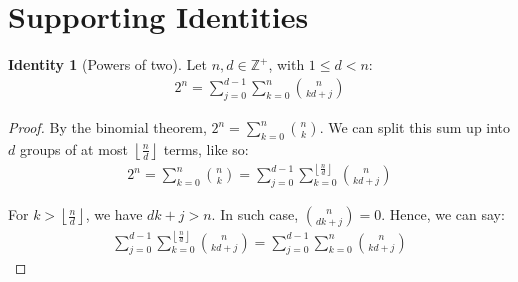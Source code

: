 \documentclass{article}
\theoremstyle{plain}
\theoremstyle{definition}
\newtheorem{identity}{Identity}
\newcommand{\floor}[1]{\left\lfloor #1 \right\rfloor}
\newcommand{\Z}{\mathbb{Z}}
\begin{document}
\section{Supporting Identities}

\begin{identity}[Powers of two] \label{identity:powersoftwobinomialgroups}
Let $n, d \in \Z^+$, with $1 \leq d < n$:
\begin{align}
    2^n = \sum_{j=0}^{d-1} \sum_{k=0}^{n} \binom{n}{kd + j}
\end{align}
\end{identity}
\begin{proof}
    By the binomial theorem, $2^n = \sum_{k=0}^{n} \binom{n}{k}$. We can split this sum up into $d$ groups of at most $\floor{\frac{n}{d}}$ terms, like so:
    \begin{align}
        2^n = \sum_{k=0}^{n} \binom{n}{k} = \sum_{j=0}^{d-1} \sum_{k=0}^{\floor{\frac{n}{d}}} \binom{n}{kd + j}
    \end{align}

    For $k > \floor{\frac{n}{d}}$, we have $d k + j > n$. In such case, $\binom{n}{d k + j} = 0$. Hence, we can say:
    \begin{align}
        \sum_{j=0}^{d-1} \sum_{k=0}^{\floor{\frac{n}{d}}} \binom{n}{kd + j} = \sum_{j=0}^{d-1} \sum_{k=0}^{n} \binom{n}{kd + j}
    \end{align}
\end{proof}
\end{document}
